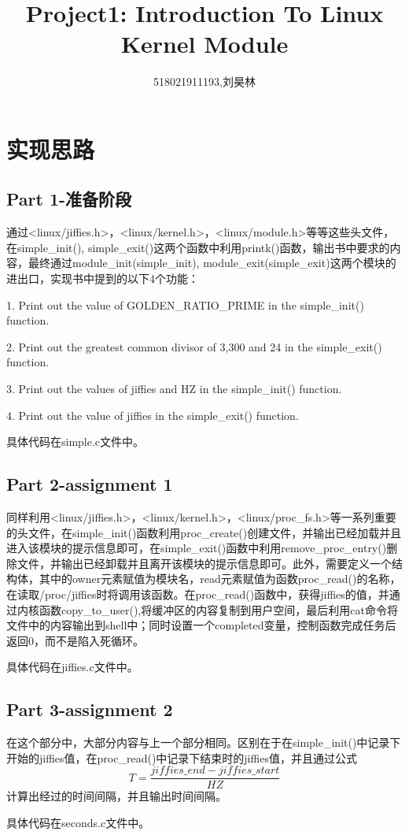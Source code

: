 \documentclass[11pt,a4paper]{article}
\title{\textbf{Project1: Introduction To Linux Kernel Module}} %
\author{518021911193,刘昊林} %
\date{} %
\begin{document}
	\maketitle %
	\section{实现思路}
	\subsection{Part 1-准备阶段}
	通过<linux/jiffies.h>，<linux/kernel.h>，<linux/module.h>等等这些头文件，在simple\_init(),
	simple\_exit()这两个函数中利用printk()函数，输出书中要求的内容，最终通过module\_init(simple\_init),
	module\_exit(simple\_exit)这两个模块的进出口，实现书中提到的以下4个功能：\par
	1. Print out the value of GOLDEN\_RATIO\_PRIME in the simple\_init() function.\par
	2. Print out the greatest common divisor of 3,300 and 24 in the simple\_exit() function.\par
	3. Print out the values of jiffies and HZ in the simple\_init() function.\par
	4. Print out the value of jiffies in the simple\_exit() function.\par
	具体代码在simple.c文件中。
	\subsection{Part 2-assignment 1}
	同样利用<linux/jiffies.h>，<linux/kernel.h>，<linux/proc\_fs.h>等一系列重要的头文件，在simple\_init()函数利用proc\_create()创建文件，并输出已经加载并且进入该模块的提示信息即可，在simple\_exit()函数中利用remove\_proc\_entry()删除文件，并输出已经卸载并且离开该模块的提示信息即可。此外，需要定义一个结构体，其中的owner元素赋值为模块名，read元素赋值为函数proc\_read()的名称，在读取/proc/jiffies时将调用该函数。在proc\_read()函数中，获得jiffies的值，并通过内核函数copy\_to\_user(),将缓冲区的内容复制到用户空间，最后利用cat命令将文件中的内容输出到shell中；同时设置一个completed变量，控制函数完成任务后返回0，而不是陷入死循环。\par
	具体代码在jiffies.c文件中。
	\subsection{Part 3-assignment 2}
	在这个部分中，大部分内容与上一个部分相同。区别在于在simple\_init()中记录下开始的jiffies值，在proc\_read()中记录下结束时的jiffies值，并且通过公式$$T=\dfrac{jiffies\_end-jiffies\_start}{HZ}$$计算出经过的时间间隔，并且输出时间间隔。\par
	具体代码在seconds.c文件中。
	
\end{document}
